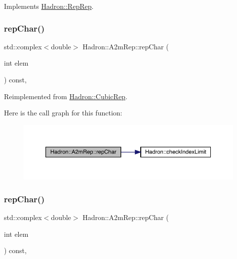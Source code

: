 Implements \mbox{\hyperlink{structHadron_1_1RepRep_ab3213025f6de249f7095892109575fde}{Hadron\+::\+Rep\+Rep}}.

\mbox{\label{structHadron_1_1A2mRep_a67d04149198c33ca703b1eb5fc0198f8}} 
\subsubsection{\texorpdfstring{repChar()}{repChar()}\hspace{0.1cm}{\footnotesize\ttfamily [1/2]}}
{\footnotesize\ttfamily std\+::complex$<$double$>$ Hadron\+::\+A2m\+Rep\+::rep\+Char (\begin{DoxyParamCaption}\item[{int}]{elem }\end{DoxyParamCaption}) const\hspace{0.3cm}{\ttfamily [inline]}, {\ttfamily [virtual]}}



Reimplemented from \mbox{\hyperlink{structHadron_1_1CubicRep_af45227106e8e715e84b0af69cd3b36f8}{Hadron\+::\+Cubic\+Rep}}.

Here is the call graph for this function\+:
\nopagebreak
\begin{figure}[H]
\begin{center}
\leavevmode
\includegraphics[width=350pt]{da/db3/structHadron_1_1A2mRep_a67d04149198c33ca703b1eb5fc0198f8_cgraph}
\end{center}
\end{figure}
\mbox{\label{structHadron_1_1A2mRep_a67d04149198c33ca703b1eb5fc0198f8}} 
\subsubsection{\texorpdfstring{repChar()}{repChar()}\hspace{0.1cm}{\footnotesize\ttfamily [2/2]}}
{\footnotesize\ttfamily std\+::complex$<$double$>$ Hadron\+::\+A2m\+Rep\+::rep\+Char (\begin{DoxyParamCaption}\item[{int}]{elem }\end{DoxyParamCaption}) const\hspace{0.3cm}{\ttfamily [inline]}, {\ttfamily [virtual]}}



